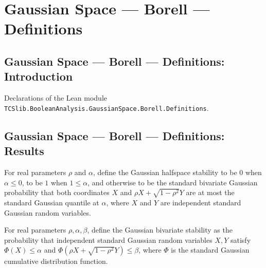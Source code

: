 \section{Gaussian Space --- Borell --- Definitions}
\subsection*{Gaussian Space --- Borell --- Definitions: Introduction}

Declarations of the Lean module \texttt{TCSlib.BooleanAnalysis.GaussianSpace.Borell.Definitions}.

\subsection*{Gaussian Space --- Borell --- Definitions: Results}

\begin{definition}
\label{BooleanAnalysis.GaussianSpace.gaussianHalfspaceStability}
\leanok
{}
For real parameters $\rho$ and $\alpha$, define the Gaussian halfspace stability to be
$0$ when $\alpha\leq 0$, to be $1$ when $1\leq\alpha$, and otherwise to be the standard
bivariate Gaussian probability that both coordinates $X$ and $\rho X+\sqrt{1-\rho^2}Y$
are at most the standard Gaussian quantile at $\alpha$, where $X$ and $Y$ are
independent standard Gaussian random variables.
\end{definition}

\begin{definition}
\label{BooleanAnalysis.GaussianSpace.gaussianBivariateStability}
\leanok
{}
For real parameters $\rho,\alpha,\beta$, define the Gaussian bivariate stability as the
probability that independent standard Gaussian random variables $X,Y$ satisfy
$\Phi(X)\leq\alpha$ and $\Phi(\rho X+\sqrt{1-\rho^2}Y)\leq\beta$, where $\Phi$ is the
standard Gaussian cumulative distribution function.
\end{definition}

